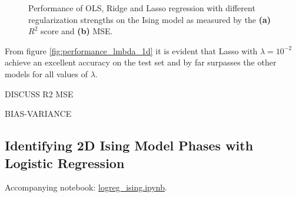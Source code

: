 \begin{figure}[H]
\centering
{}
\qquad
{}
\caption{Performance of OLS, Ridge and Lasso regression with different regularization strengths on the Ising model as measured by the \textbf{(a)} $R^2$ score and \textbf{(b)} MSE.}
\label{fig:performance_lmbda_1d}
\end{figure}

From figure \autoref{fig:performance_lmbda_1d} it is evident that Lasso with $\lambda=10^{-2}$ achieve an excellent accuracy on the test set and by far surpasses the other models for all values of $\lambda$. 



DISCUSS R2 MSE

BIAS-VARIANCE

\subsection{Identifying 2D Ising Model Phases with Logistic Regression}\label{sec:results logreg}
Accompanying notebook: \href{https://github.com/nicolossus/FYS-STK4155-Project2/blob/master/notebooks/logreg_ising.ipynb}{logreg\_ising.ipynb}. 


